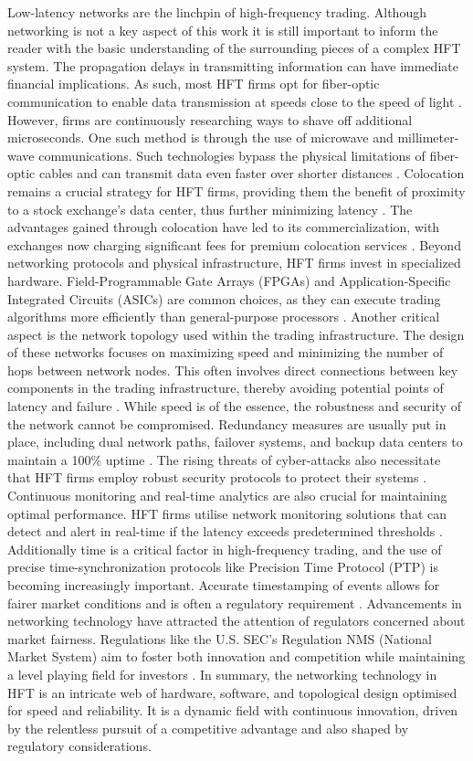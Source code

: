 \documentclass{article}
\theoremstyle{break}
\begin{document}
Low-latency networks are the linchpin of high-frequency trading. Although networking is not a key aspect of this work it is still important to inform the reader with the basic understanding of the surrounding pieces of a complex HFT system. The propagation delays in transmitting information can have immediate financial implications. As such, most HFT firms opt for fiber-optic communication to enable data transmission at speeds close to the speed of light \cite{2}. However, firms are continuously researching ways to shave off additional microseconds. One such method is through the use of microwave and millimeter-wave communications. Such technologies bypass the physical limitations of fiber-optic cables and can transmit data even faster over shorter distances \cite{19}. Colocation remains a crucial strategy for HFT firms, providing them the benefit of proximity to a stock exchange’s data center, thus further minimizing latency \cite{20,21}. The advantages gained through colocation have led to its commercialization, with exchanges now charging significant fees for premium colocation services \cite{22}. Beyond networking protocols and physical infrastructure, HFT firms invest in specialized hardware. Field-Programmable Gate Arrays (FPGAs) and Application-Specific Integrated Circuits (ASICs) are common choices, as they can execute trading algorithms more efficiently than general-purpose processors \cite{23, 24}. Another critical aspect is the network topology used within the trading infrastructure. The design of these networks focuses on maximizing speed and minimizing the number of hops between network nodes. This often involves direct connections between key components in the trading infrastructure, thereby avoiding potential points of latency and failure \cite{2, 25}. While speed is of the essence, the robustness and security of the network cannot be compromised. Redundancy measures are usually put in place, including dual network paths, failover systems, and backup data centers to maintain a 100\% uptime \cite{26, 2}. The rising threats of cyber-attacks also necessitate that HFT firms employ robust security protocols to protect their systems \cite{27}. Continuous monitoring and real-time analytics are also crucial for maintaining optimal performance. HFT firms utilise network monitoring solutions that can detect and alert in real-time if the latency exceeds predetermined thresholds \cite{28,29}. Additionally time is a critical factor in high-frequency trading, and the use of precise time-synchronization protocols like Precision Time Protocol (PTP) is becoming increasingly important. Accurate timestamping of events allows for fairer market conditions and is often a regulatory requirement \cite{32}. Advancements in networking technology have attracted the attention of regulators concerned about market fairness. Regulations like the U.S. SEC's Regulation NMS (National Market System) aim to foster both innovation and competition while maintaining a level playing field for investors \cite{30, 31}. In summary, the networking technology in HFT is an intricate web of hardware, software, and topological design optimised for speed and reliability. It is a dynamic field with continuous innovation, driven by the relentless pursuit of a competitive advantage and also shaped by regulatory considerations.
\end{document}
